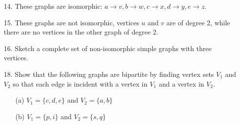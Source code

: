 \documentclass{article}
\begin{document}
\begin{itemize}
    \item[14.] {\color{blue} These graphs are isomorphic: $a\to v, b\to w, c\to x, d\to y, e\to z$.}
    
    \item[15.] {\color{blue} These graphs are not isomorphic, vertices $u$ and $v$ are of degree 2, while there are no vertices in the other graph of degree 2.}
    
    \item[16.] Sketch a complete set of non-isomorphic simple graphs with three vertices.
    
    \begin{center}
    \end{center}
    
    \item[18.] Show that the following graphs are bipartite by finding vertex sets $V_1$ and $V_2$ so that each edge is incident with a vertex in $V_1$ and a vertex in $V_2$.
    \begin{itemize}
        \item[(a)] {\color{blue} $V_1=\{c,d,e\}$ and $V_2=\{a,b\}$}
        
        \item[(b)] {\color{blue} $V_1=\{p,i\}$ and $V_2=\{s,q\}$}
    \end{itemize}
\end{itemize}
\end{document}

